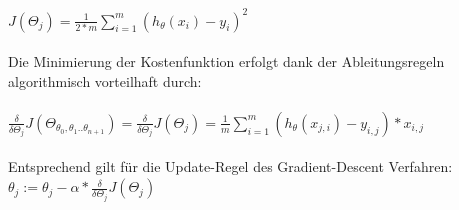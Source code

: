 \documentclass[a4paper]{scrreprt}
\begin{document}
\begin{enumerate}
$J (\Theta_{j})= \frac{1}{2*m}\sum_{i=1}^{m} (h_{\theta}(x_{i})-y_{i})^{2}$\\\\
Die Minimierung der Kostenfunktion erfolgt dank der Ableitungsregeln algorithmisch vorteilhaft durch:\\\\
$\frac{\delta}{\delta \Theta_{j}} J(\Theta_{\theta_{0}, \theta_{1}..\theta_{n+1}})= \frac{\delta}{\delta \Theta_{j}} J(\Theta_{j})=\frac{1}{m}\sum_{i=1}^{m} (h_{\theta} (x_{j,i})-y_{i,j})*x_{i,j}$\\\\
Entsprechend gilt für die Update-Regel des Gradient-Descent Verfahren:\\
$\theta_{j}:= \theta_{j} - \alpha * \frac{\delta}{\delta \Theta_{j}} J(\Theta_{j})$\\\\
\end{enumerate}
\par\bigskip
\end{document}
